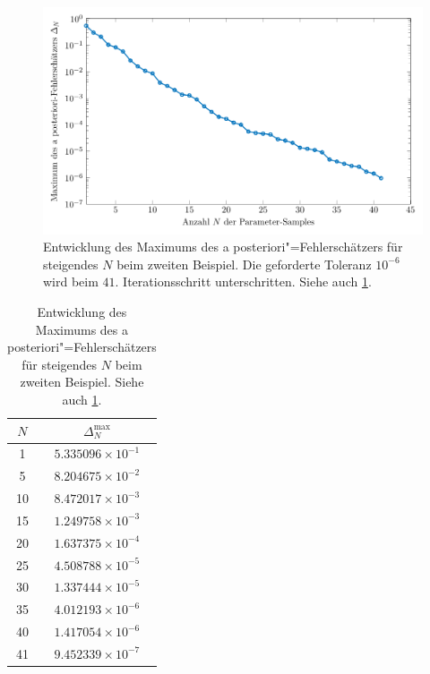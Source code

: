 \documentclass[../main.tex]{subfiles}
\begin{document}
\begin{figure}[tb!]
    \centering
    \includegraphics[width=1\textwidth]{figures/chapter5/ch5ex2_rbm_error.pdf}
    \caption[Entwicklung des Maximums des a posteriori"=Fehlerschätzers für steigendes $N$, zweites Beispiel.]{%
        Entwicklung des Maximums des a posteriori"=Fehlerschätzers für steigendes $N$ beim zweiten Beispiel.
        Die geforderte Toleranz $10^{-6}$ wird beim $41.$ Iterationsschritt unterschritten.
        Siehe auch \cref{table:entwicklung_rbm_2}.
        }
    \label{figure:entwicklung_rbm_fehler}
\end{figure}

\begin{table}
    \centering
    \begin{tabular}{|c|c|}\hline
      $N$ & $\Delta_{N}^{\mathrm{max}}$ \\ \hline
      1 & $5.335096{\times}10^{-1}$ \\ %
      5 & $8.204675{\times}10^{-2}$ \\ %
     10 & $8.472017{\times}10^{-3}$ \\ %
     15 & $1.249758{\times}10^{-3}$ \\ %
     20 & $1.637375{\times}10^{-4}$ \\ %
     25 & $4.508788{\times}10^{-5}$ \\ %
     30 & $1.337444{\times}10^{-5}$ \\ %
     35 & $4.012193{\times}10^{-6}$ \\ %
     40 & $1.417054{\times}10^{-6}$ \\ %
     41 & $9.452339{\times}10^{-7}$ \\ \hline
    \end{tabular}
    \caption[Entwicklung des Maximums des a posteriori"=Fehlerschätzers für einige $N$, zweites Beispiel.]{%
        Entwicklung des Maximums des a posteriori"=Fehlerschätzers für steigendes $N$ beim zweiten Beispiel.
        Siehe auch \cref{figure:entwicklung_rbm_fehler}.
    }
    \label{table:entwicklung_rbm_2}
\end{table}
\end{document}
